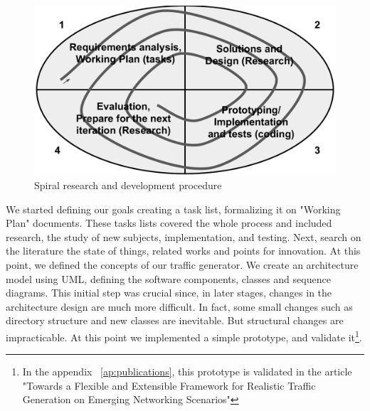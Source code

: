 \begin{figure}[!ht]
    \centering
    \includegraphics[scale=0.4]{figures/ch6/spiral}
    \caption{Spiral research and development procedure}
    \label{fig:spiral}
\end{figure}


We started defining our goals creating a task list, formalizing it on "Working Plan" documents. These tasks lists covered the whole process and included research, the study of new subjects, implementation, and testing. Next, search on the literature the state of things, related works and points for innovation. At this point, we defined the concepts of our traffic generator. We create an architecture model using UML, defining the software components, classes and sequence diagrams. This initial step was crucial since, in later stages, changes in the architecture design are much more difficult. In fact, some small changes such as directory structure and new classes are inevitable. But structural changes are impracticable. At this point we implemented a simple prototype, and validate it\footnote{In the appendix ~\ref{ap:publications}, this prototype is validated in the article "Towards a Flexible and Extensible Framework for Realistic Traffic Generation on Emerging Networking Scenarios"}. 


